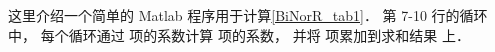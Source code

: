 

这里介绍一个简单的 Matlab 程序用于计算\autoref{BiNorR_tab1}． 第 7-10 行的循环中， 每个循环通过  项的系数计算  项的系数， 并将  项累加到求和结果  上．

